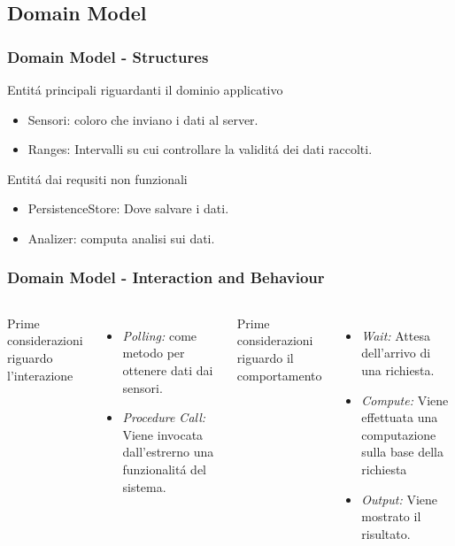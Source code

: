 \documentclass{beamer}
\begin{document}

\subsection{Domain Model}

\begin{frame}
  \frametitle{Domain Model - Structures}
  Entit\'a principali riguardanti il dominio applicativo
  \begin{itemize}
    \item Sensori: coloro che inviano i dati al server.
    \item Ranges: Intervalli su cui controllare la validit\'a  dei dati raccolti.
  \end{itemize}
  Entit\'a dai requsiti non funzionali
  \begin{itemize}
    \item PersistenceStore: Dove salvare i dati.
    \item Analizer: computa analisi sui dati.
  \end{itemize}
\end{frame}

\begin{frame}
  \frametitle{Domain Model - Interaction and Behaviour}
  \begin{columns}[c] %
    Prime considerazioni riguardo l'interazione
  \begin{itemize}
    \item \textit{Polling:} come metodo per ottenere dati dai sensori.
    \item \textit{Procedure Call:} Viene invocata dall'estrerno una funzionalit\'a del sistema.
  \end{itemize}
    Prime considerazioni riguardo il comportamento
  \begin{itemize}
    \item \textit{Wait:} Attesa dell'arrivo di una richiesta.
    \item \textit{Compute:} Viene effettuata una computazione sulla base della richiesta
    \item \textit{Output:} Viene mostrato il risultato.
  \end{itemize}
\end{columns}
\end{frame}
\end{document}
